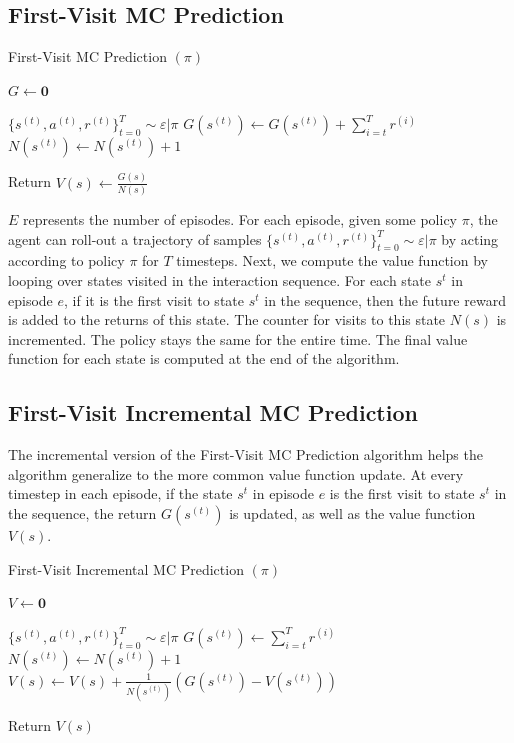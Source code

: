 \documentclass[11pt]{article}
\begin{document}
\subsection{First-Visit MC Prediction}
\begin{algorithm}[H]
\caption{First-Visit MC Prediction $(\pi)$}
\label{algo:FVMC}
\begin{algorithmic}[1]
\STATE $G \leftarrow \mathbf{0}$ \hfill
{}

\STATE $\{s^{(t)}, a^{(t)}, r^{(t)}\}_{t=0}^T \sim \varepsilon|\pi$ \hfill 
{}
\STATE $G(s^{(t)}) \leftarrow G(s^{(t)}) + \sum_{i=t}^T r^{(i)}$ \hfill 
\STATE $N(s^{(t)}) \leftarrow N(s^{(t)})  + 1$ \hfill 
\ENDIF


\ENDFOR

\ENDFOR

\STATE Return $V(s) \leftarrow \frac{G(s)}{N(s)}$  \hfill
\end{algorithmic}
\end{algorithm}

$E$ represents the number of episodes. For each episode, given some policy $\pi$, the agent can roll-out a trajectory of samples $\{s^{(t)}, a^{(t)}, r^{(t)}\}_{t=0}^T \sim \varepsilon|\pi$ by acting according to policy $\pi$ for $T$ timesteps. Next, we compute the value function by looping over states visited in the interaction sequence. For each state $s^t$ in episode $e$, if it is the first visit to state $s^t$ in the sequence, then the future reward is added to the returns of this state. The counter for visits to this state $N(s)$ is incremented. The policy stays the same for the entire time. The final value function for each state is computed at the end of the algorithm.

\subsection{First-Visit Incremental MC Prediction}
The incremental version of the First-Visit MC Prediction algorithm helps the algorithm generalize to the more common value function update. At every timestep in each episode, if the state $s^t$ in episode $e$ is the first visit to state $s^t$ in the sequence, the return $G(s^{(t)})$ is updated, as well as the value function $V(s)$. 

\begin{algorithm}[H]
\caption{First-Visit Incremental MC Prediction $(\pi)$}
\label{algo:FVIMC}
\begin{algorithmic}[1]
\STATE $V \leftarrow \mathbf{0}$ \hfill
{}

\STATE $\{s^{(t)}, a^{(t)}, r^{(t)}\}_{t=0}^T \sim \varepsilon|\pi$ \hfill 
{}
\STATE $G(s^{(t)}) \leftarrow \sum_{i=t}^T r^{(i)}$ \hfill 
\STATE $N(s^{(t)}) \leftarrow N(s^{(t)})  + 1$ \hfill 
\STATE $V(s) \leftarrow V(s) + \frac{1}{N(s^{(t)})}(G(s^{(t)})-V(s^{(t)}))$  \hfill
\ENDIF

\ENDFOR
\ENDFOR
\STATE Return $V(s)$  \hfill
\end{algorithmic}
\end{algorithm}
\end{document}
